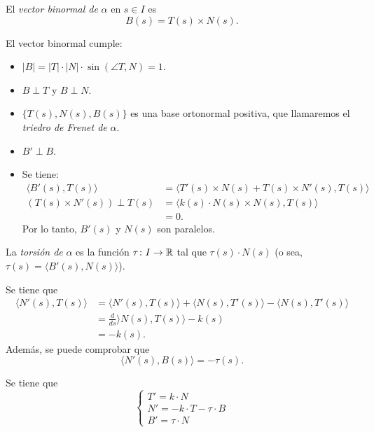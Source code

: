 \begin{definition}
	El \textit{vector binormal de} $\alpha$ en $s \in I$ es
	\[ B(s) = T(s) \times N(s). \]
\end{definition}
\begin{property}
	El vector binormal cumple:
	\begin{itemize}
		\item $|B| = |T| \cdot |N| \cdot \sin(\angle T,N) = 1$.

		\item $B \perp T$ y $B \perp N$.

		\item $\{T(s), N(s), B(s)\}$ es una base ortonormal positiva, que llamaremos el \textit{triedro de Frenet de} $\alpha$.

		\item $B' \perp B$.

		\item Se tiene:
		\begin{align*}
			\langle B'(s), T(s) \rangle &= \langle T'(s) \times N(s) + T(s) \times N'(s), T(s) \rangle \\
			(T(s) \times N'(s)) \perp T(s) &= \langle k(s) \cdot N(s) \times N(s), T(s) \rangle \\
			&= 0
		.\end{align*}
		Por lo tanto, $B'(s)$ y $N(s)$ son paralelos.
	\end{itemize}
\end{property}

\begin{definition}[Torsión]
	La \textit{torsión de} $\alpha$ es la función $\tau \colon I \to \mathbb{R}$ tal que $\tau(s) \cdot N(s)$ (o sea, $\tau(s) = \langle B'(s), N(s) \rangle$).
\end{definition}

\begin{note}
	Se tiene que
	\begin{align*}
		\langle N'(s), T(s) \rangle &= \langle N'(s), T(s) \rangle + \langle N(s), T'(s) \rangle - \langle N(s), T'(s) \rangle \\
		&= \frac{d}{ds} \rangle N(s), T(s) \rangle - k(s) \\
		&= -k(s)
	.\end{align*}
	Además, se puede comprobar que
	\[ \langle N'(s), B(s) \rangle = -\tau(s). \]
\end{note}

\begin{prop}
	Se tiene que
	\[ \begin{cases}
		T' = k \cdot N \\
		N' = -k \cdot T - \tau \cdot B \\
		B' = \tau \cdot N
	\end{cases} \]
\end{prop}
